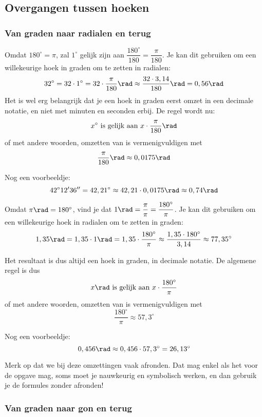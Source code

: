 \documentclass[a4paper,12pt]{article}
\begin{document}
\subsection{Overgangen tussen hoeken}

\subsubsection{Van graden naar radialen en terug}

Omdat $180^\circ = \pi$, zal $1^\circ$ gelijk zijn aan $\dfrac{180^\circ}{180}=\dfrac{\pi}{180}$. Je kan dit gebruiken om een willekeurige hoek in graden om te zetten in radialen:
\[32^\circ = 32\cdot 1^\circ = 32 \cdot \frac{\pi}{180} \rad\approx \frac{32\cdot 3,14}{180}\rad=0,56\rad\]
Het is wel erg belangrijk dat je een hoek in graden eerst omzet in een decimale notatie, en niet met minuten en seconden erbij. De regel wordt nu:
\[x^\circ \textup{ is gelijk aan } x\cdot \frac{\pi}{180} \rad\]
of met andere woorden, omzetten van  is vermenigvuldigen met
\[\dfrac{\pi}{180}\rad\approx 0,0175\rad\]

Nog een voorbeeldje:
\[42^\circ12'36''=42,21^\circ\approx 42,21 \cdot 0,0175 \rad\approx 0,74 \rad\]

Omdat $\pi \rad = 180^\circ$, vind je dat $1 \rad = \dfrac{\pi}{\pi}=\dfrac{180^\circ}{\pi}$. Je kan dit gebruiken om een willekeurige hoek in radialen om te zetten in graden:
\[1,35 \rad = 1,35 \cdot 1 \rad = 1,35 \cdot \frac{180^\circ}{\pi}\approx \frac{1,35 \cdot 180^\circ}{3,14}\approx 77,35^\circ\]

Het resultaat is dus altijd een hoek in graden, in decimale notatie.  De algemene regel is dus
\[x \rad \textup{ is gelijk aan } x\cdot \frac{180^\circ}{\pi}\]
of met andere woorden, omzetten van  is vermenigvuldigen met
\[
\frac{180^\circ}{\pi} \approx 57,3^\circ
\]

Nog een voorbeeldje:
\[0,456 \rad \approx 0,456 \cdot 57,3^\circ = 26,13^\circ\]

Merk op dat we bij deze omzettingen vaak afronden. Dat mag enkel als het voor de opgave mag, soms moet je nauwkeurig en symbolisch werken, en dan gebruik je de formules zonder afronden!

\subsubsection{Van graden naar gon en terug}
\end{document}
